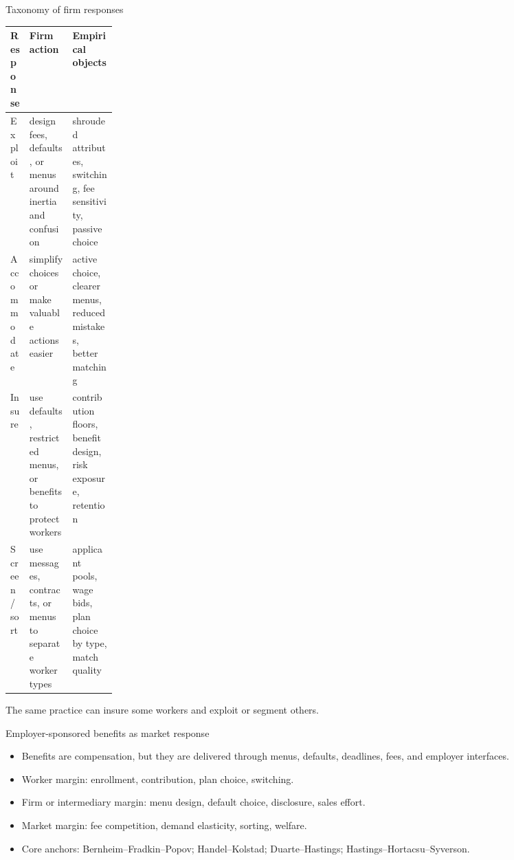 \documentclass[aspectratio=169,11pt]{beamer}
\begin{document}
\begin{frame}{Taxonomy of firm responses}
\scriptsize
\begin{tabularx}{\linewidth}{p{0.18\linewidth} Y Y}
\toprule
Response & Firm action & Empirical objects \\
\midrule
Exploit & design fees, defaults, or menus around inertia and confusion & shrouded attributes, switching, fee sensitivity, passive choice \\
Accommodate & simplify choices or make valuable actions easier & active choice, clearer menus, reduced mistakes, better matching \\
Insure & use defaults, restricted menus, or benefits to protect workers & contribution floors, benefit design, risk exposure, retention \\
Screen / sort & use messages, contracts, or menus to separate worker types & applicant pools, wage bids, plan choice by type, match quality \\
\bottomrule
\end{tabularx}

\vspace{0.6em}
The same practice can insure some workers and exploit or segment others.
\end{frame}

\begin{frame}{Employer-sponsored benefits as market response}
\begin{itemize}
    \item Benefits are compensation, but they are delivered through menus, defaults, deadlines, fees, and employer interfaces.
    \item Worker margin: enrollment, contribution, plan choice, switching.
    \item Firm or intermediary margin: menu design, default choice, disclosure, sales effort.
    \item Market margin: fee competition, demand elasticity, sorting, welfare.
    \item Core anchors: Bernheim--Fradkin--Popov; Handel--Kolstad; Duarte--Hastings; Hastings--Hortacsu--Syverson.
\end{itemize}
\end{frame}
\end{document}
